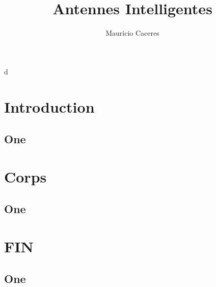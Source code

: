 \documentclass[11pt]{beamer}
\begin{document}
	\author{Mauricio Caceres}
	\title{Antennes Intelligentes}
	\subtitle{}
	\logo{}
	\institute{}
	\date{}
	\subject{}
	\frame[plain]{\maketitle}d
	
	\section{Introduction}
	\begin{frame}
	\subsection{One}
		\frametitle{}
	\end{frame}

	\section{Corps}
	\begin{frame}
		\subsection{One}
		\frametitle{}
	\end{frame}

	\section{FIN}
\begin{frame}
	\subsection{One}
	\frametitle{}
\end{frame}
\end{document}
